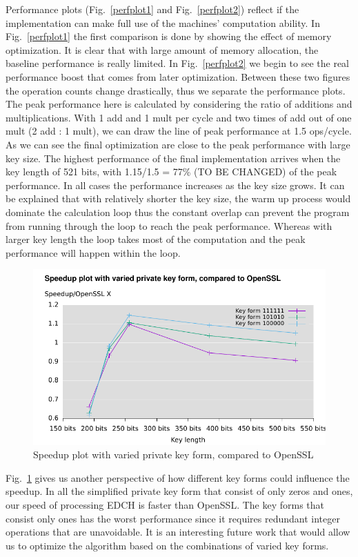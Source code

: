 Performance plots (Fig.~\ref{perfplot1} and Fig.~\ref{perfplot2}) reflect if the implementation can make full use of the machines' computation ability. In Fig.~\ref{perfplot1} the first comparison is done by showing the effect of memory optimization. It is clear that with large amount of memory allocation, the baseline performance is really limited. In Fig.~\ref{perfplot2} we begin to see the real performance boost that comes from later optimization. Between these two figures the operation counts change drastically, thus we separate the performance plots. The peak performance here is calculated by considering the ratio of additions and multiplications. With 1 add and 1 mult per cycle and two times of add out of one mult (2 add : 1 mult), we can draw the line of peak performance at 1.5 ops/cycle. As we can see the final optimization are close to the peak performance with large key size. The highest performance of the final implementation arrives when the key length of 521 bits, with 1.15/1.5 = 77\% (TO BE CHANGED) of the peak performance. In all cases the performance increases as the key size grows. It can be explained that with relatively shorter the key size, the warm up process would dominate the calculation loop thus the constant overlap can prevent the program from running through the loop to reach the peak performance. Whereas with larger key length the loop takes most of the computation and the peak performance will happen within the loop.

\begin{figure}[h!]\centering
  \includegraphics[scale=0.7]{keysize}
  \caption{Speedup plot with varied private key form, compared to OpenSSL\label{keysize}}
\end{figure}

Fig.~\ref{keysize} gives us another perspective of how different key forms could influence the speedup.  In all the simplified private key form that consist of only zeros and ones, our speed of processing EDCH is faster than OpenSSL. The key forms that consist only ones has the worst performance since it requires redundant integer operations that are unavoidable. It is an interesting future work that would allow us to optimize the algorithm based on the combinations of varied key forms. 